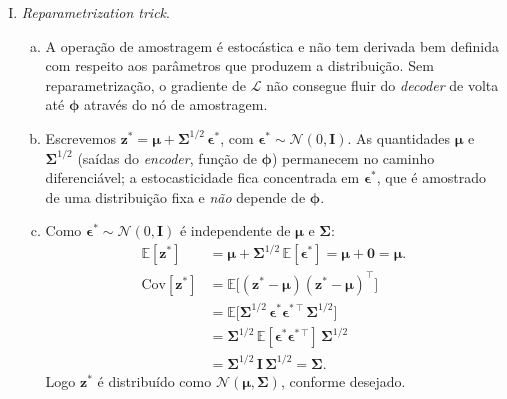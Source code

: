 \documentclass{dlproblemset}
\begin{document}
\begin{enumerate}[I)]
    \item \textit{Reparametrization trick}.
    \begin{enumerate}[(a)]
        \item A operação de amostragem é estocástica e não tem derivada bem definida com respeito aos parâmetros que produzem a distribuição. Sem reparametrização, o gradiente de $\mathcal{L}$ não consegue fluir do \textit{decoder} de volta até $\boldsymbol{\phi}$ através do nó de amostragem.
        \item Escrevemos $\mathbf{z}^{*} = \boldsymbol{\mu} + \boldsymbol{\Sigma}^{1/2}\,\boldsymbol{\epsilon}^{*}$, com $\boldsymbol{\epsilon}^{*} \sim \mathcal{N}(0, \mathbf{I})$. As quantidades $\boldsymbol{\mu}$ e $\boldsymbol{\Sigma}^{1/2}$ (saídas do \textit{encoder}, função de $\boldsymbol{\phi}$) permanecem no caminho diferenciável; a estocasticidade fica concentrada em $\boldsymbol{\epsilon}^{*}$, que é amostrado de uma distribuição fixa e \emph{não} depende de $\boldsymbol{\phi}$.
        \item Como $\boldsymbol{\epsilon}^{*} \sim \mathcal{N}(0, \mathbf{I})$ é independente de $\boldsymbol{\mu}$ e $\boldsymbol{\Sigma}$:
        \begin{align*}
            \mathbb{E}[\mathbf{z}^{*}]  &= \boldsymbol{\mu} + \boldsymbol{\Sigma}^{1/2}\,\mathbb{E}[\boldsymbol{\epsilon}^{*}] = \boldsymbol{\mu} + \mathbf{0} = \boldsymbol{\mu}. \\
            \mathrm{Cov}[\mathbf{z}^{*}] &= \mathbb{E}\bigl[(\mathbf{z}^{*} - \boldsymbol{\mu})(\mathbf{z}^{*} - \boldsymbol{\mu})^{\top}\bigr] \\
                                 &= \mathbb{E}\bigl[\boldsymbol{\Sigma}^{1/2}\,\boldsymbol{\epsilon}^{*}\boldsymbol{\epsilon}^{*\,\top}\,\boldsymbol{\Sigma}^{1/2}\bigr] \\
                                 &= \boldsymbol{\Sigma}^{1/2}\,\mathbb{E}[\boldsymbol{\epsilon}^{*}\boldsymbol{\epsilon}^{*\,\top}]\,\boldsymbol{\Sigma}^{1/2} \\
                                 &= \boldsymbol{\Sigma}^{1/2}\,\mathbf{I}\,\boldsymbol{\Sigma}^{1/2} = \boldsymbol{\Sigma}.
        \end{align*}
        Logo $\mathbf{z}^{*}$ é distribuído como $\mathcal{N}(\boldsymbol{\mu}, \boldsymbol{\Sigma})$, conforme desejado.
    \end{enumerate}


\end{enumerate}
\end{document}
